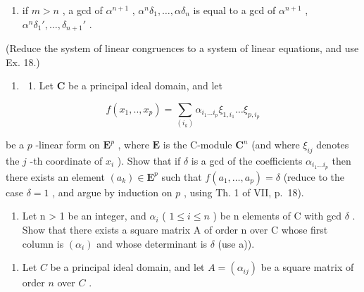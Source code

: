 \begin{enumerate}
\def\labelenumi{\alph{enumi})}
\setcounter{enumi}{1}
\tightlist
\item
  if \(m > n\) , a gcd of \(\alpha^{n+1}\) , \(\alpha^n \delta_1, \ldots, \alpha \delta_n\) is equal to a gcd of \(\alpha^{n+1}\) , \(\alpha^n \delta_1', \ldots, \delta_{n+1}'\) .
\end{enumerate}

(Reduce the system of linear congruences to a system of linear equations, and use Ex. 18.)

\begin{enumerate}
\def\labelenumi{\arabic{enumi})}
\setcounter{enumi}{19}
\tightlist
\item
  \begin{enumerate}
  \def\labelenumii{\alph{enumii})}
  \tightlist
  \item
    Let \(\mathbf{C}\) be a principal ideal domain, and let
  \end{enumerate}
\end{enumerate}

\[
f (x _ {1},.., x _ {p}) = \sum_ {(i _ {k})} \alpha_ {i _ {1} \dots i _ {p}} \xi_ {1, i _ {1}} \dots \xi_ {p, i _ {p}}
\]

be a \(p\) -linear form on \(\mathbf{E}^p\) , where \(\mathbf{E}\) is the C-module \(\mathbf{C}^n\) (and where \(\xi_{ij}\) denotes the \(j\) -th coordinate of \(x_i\) ). Show that if \(\delta\) is a gcd of the coefficients \(\alpha_{i_1\dots i_p}\) then there exists an element \((a_k)\in \mathbf{E}^p\) such that \(f(a_1,\dots,a_p) = \delta\) (reduce to the case \(\delta = 1\) , and argue by induction on \(p\) , using Th. 1 of VII, p.~18).

\begin{enumerate}
\def\labelenumi{\alph{enumi})}
\setcounter{enumi}{1}
\tightlist
\item
  Let n \textgreater{} 1 be an integer, and \(\alpha_{i}\) ( \(1 \leqslant i \leqslant n\) ) be n elements of C with gcd \(\delta\) . Show that there exists a square matrix A of order n over C whose first column is \((\alpha_{i})\) and whose determinant is \(\delta\) (use a)).
\end{enumerate}

\begin{enumerate}
\def\labelenumi{\arabic{enumi})}
\setcounter{enumi}{20}
\tightlist
\item
  Let \(C\) be a principal ideal domain, and let \(A = (\alpha_{ij})\) be a square matrix of order \(n\) over \(C\) .
\end{enumerate}

